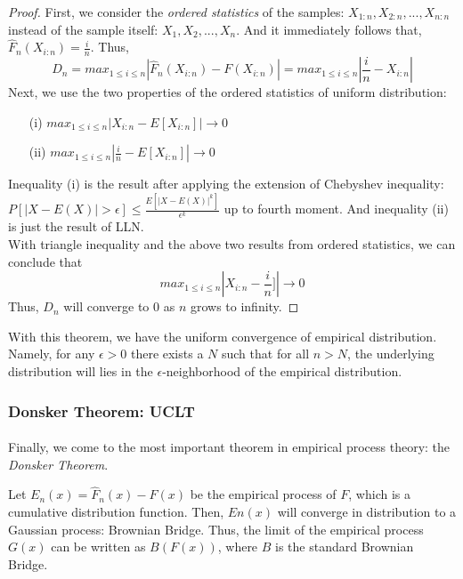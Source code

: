 \documentclass[final_project_1.tex]{subfiles}
\begin{document}
\begin{proof}
First, we consider the {\it ordered statistics} of the samples: $X_{1:n}, X_{2:n}, ..., X_{n:n}$ instead of the sample itself: $X_1, X_2, ..., X_n$. And it immediately follows that,
$\hat{F}_n(X_{i:n})=\frac{i}{n}$. Thus, 
$$D_n=max_{1\leq i\leq n}|\hat{F}_n(X_{i:n})-F(X_{i:n})|=max_{1\leq i\leq n}|\frac{i}{n}-X_{i:n}|$$
Next, we use the two properties of the ordered statistics of uniform distribution:
\begin{enumerate}
\centering
\item[(i)] $max_{1\leq i\leq n}|X_{i:n}-E[X_{i:n}]|\rightarrow 0$
\item[(ii)]$max_{1\leq i\leq n}|\frac{i}{n}-E[X_{i:n}]|\rightarrow 0$
\end{enumerate}
Inequality (i) is the result after applying the extension of Chebyshev inequality: $P[|X-E(X)|>\epsilon]\leq\frac{E[|X-E(X)|^k]}{\epsilon^k}$ up to fourth moment. And inequality (ii) is just the result of LLN.\\
With triangle inequality and the above two results from ordered statistics, we can conclude that
$$max_{1\leq i\leq n}|X_{i:n}-\frac{i}{n}]|\rightarrow 0$$
Thus, $D_n$ will converge to 0 as $n$ grows to infinity.
\end{proof}

With this theorem, we have the uniform convergence of empirical distribution. Namely, for any $\epsilon > 0$ there exists a $N$ such that for all $n>N$, the underlying distribution will lies in the $\epsilon$-neighborhood of the empirical distribution.

\subsubsection{Donsker Theorem: UCLT}
\paragraph{}
Finally, we come to the most important theorem in empirical process theory: the {\it Donsker Theorem}. 
\begin{theorem}[Donsker]
Let $E_n(x)=\hat{F}_n(x)-F(x)$ be the empirical process of $F$, which is a cumulative distribution function. Then, $En(x)$ will converge in distribution to a Gaussian process: Brownian Bridge. Thus, the limit of the empirical process $G(x)$ can be written as $B(F(x))$, where $B$ is the standard Brownian Bridge.
\end{theorem}
\end{document}
